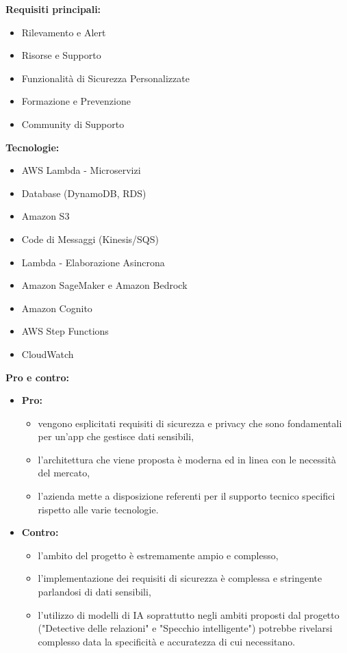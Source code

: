 \vspace{0.3cm}
\textbf{Requisiti principali:}
\begin{itemize}
	\item {Rilevamento e Alert}
	\item {Risorse e Supporto}
    \item {Funzionalità di Sicurezza Personalizzate}
    \item {Formazione e Prevenzione}
    \item {Community di Supporto}
\end{itemize}

\vspace{0.3cm}
\textbf{Tecnologie:}
\begin{itemize}
	\item {AWS Lambda - Microservizi}
    \item {Database (DynamoDB, RDS)}
    \item {Amazon S3 }
    \item {Code di Messaggi (Kinesis/SQS)}
    \item {Lambda - Elaborazione Asincrona}
    \item {Amazon SageMaker e Amazon Bedrock}
    \item {Amazon Cognito}
    \item {AWS Step Functions}
    \item {CloudWatch}
\end{itemize}

\vspace{0.3cm}
\textbf{Pro e contro:}
\begin{itemize}
	\item \textbf{Pro:} 
        \begin{itemize}
            \item vengono esplicitati requisiti di sicurezza e privacy che sono fondamentali per un'app che gestisce dati sensibili,
            \item l'architettura che viene proposta è moderna ed in linea con le necessità del mercato,
            \item l'azienda mette a disposizione referenti per il supporto tecnico specifici rispetto alle varie tecnologie.
        \end{itemize}
	\item \textbf{Contro:}
        \begin{itemize}
            \item l'ambito del progetto è estremamente ampio e complesso,
            \item l'implementazione dei requisiti di sicurezza è complessa e stringente parlandosi di dati sensibili,
            \item l'utilizzo di modelli di IA soprattutto negli ambiti proposti dal progetto ("Detective delle relazioni" e "Specchio intelligente") potrebbe rivelarsi complesso data la specificità e accuratezza di cui necessitano.
        \end{itemize}
\end{itemize}

